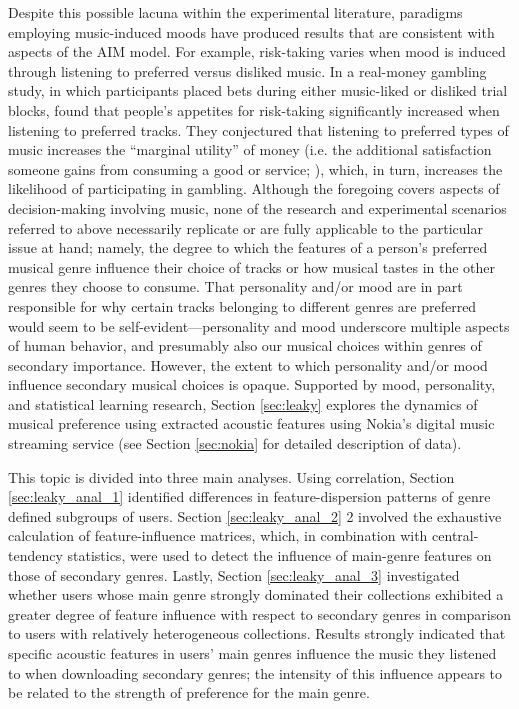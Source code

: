 \documentclass[a4paper]{article}
\begin{document}
Despite this possible lacuna within the experimental literature, paradigms employing music-induced moods have produced results that are consistent with aspects of the AIM model. For example, risk-taking varies when mood is induced through listening to preferred versus disliked music. In a real-money gambling study, in which participants placed bets during either music-liked or disliked trial blocks, \cite{halko2015risk} found that people’s appetites for risk-taking significantly increased when listening to preferred tracks. They conjectured that listening to preferred types of music increases the “marginal utility” of money (i.e. the additional satisfaction someone gains from consuming a good or service; \cite{kauder2015history,turley2000atmospheric,areni1993influence}), which, in turn, increases the likelihood of participating in gambling. Although the foregoing covers aspects of decision-making involving music, none of the research and experimental scenarios referred to above necessarily replicate or are fully applicable to the particular issue at hand; namely, the degree to which the features of a person’s preferred musical genre influence their choice of tracks or how musical tastes in the other genres they choose to consume. That personality and/or mood are in part responsible for why certain tracks belonging to different genres are preferred would seem to be self-evident—personality and mood underscore multiple aspects of human behavior, and presumably also our musical choices within genres of secondary importance. However, the extent to which personality and/or mood influence secondary musical choices is opaque. Supported by mood, personality, and statistical learning research, Section \ref{sec:leaky} explores the dynamics of musical preference using extracted acoustic features using Nokia's digital music streaming service (see Section \ref{sec:nokia} for detailed description of data).

This topic is divided into three main analyses. Using correlation, Section \ref{sec:leaky_anal_1} identified differences in feature-dispersion patterns of genre defined subgroups of users. Section \ref{sec:leaky_anal_2} 2 involved the exhaustive calculation of feature-influence matrices, which, in combination with central-tendency statistics, were used to detect the influence of main-genre features on those of secondary genres. Lastly, Section \ref{sec:leaky_anal_3} investigated whether users whose main genre strongly dominated their collections exhibited a greater degree of feature influence with respect to secondary genres in comparison to users with relatively heterogeneous collections. Results strongly indicated that specific acoustic features in users’ main genres influence the music they listened to when downloading secondary genres; the intensity of this influence appears to be related to the strength of preference for the main genre.
\end{document}
